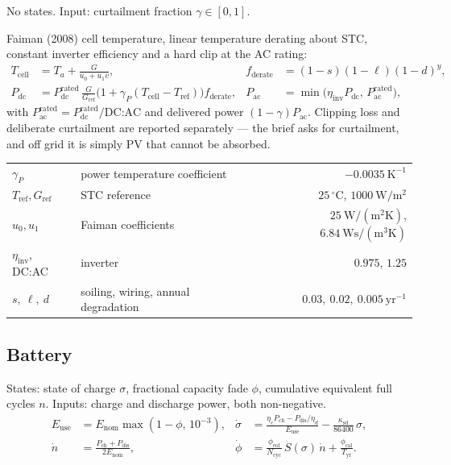 \documentclass[11pt,a4paper]{article}
\begin{document}
No states. Input: curtailment fraction $\gamma\in[0,1]$.

Faiman (2008) cell temperature, linear temperature derating about STC, constant
inverter efficiency and a hard clip at the AC rating:
\begin{align}
T_{\text{cell}} &= T_a + \frac{G}{u_0 + u_1 v}, &
f_{\text{derate}} &= (1-s)(1-\ell)(1-d)^{y},\\
P_{\text{dc}} &= P_{\text{dc}}^{\text{rated}}\,\frac{G}{G_{\text{ref}}}
  \bigl(1+\gamma_P (T_{\text{cell}}-T_{\text{ref}})\bigr) f_{\text{derate}}, &
P_{\text{ac}} &= \min\!\bigl(\eta_{\text{inv}} P_{\text{dc}},\, P_{\text{ac}}^{\text{rated}}\bigr),
\end{align}
with $P_{\text{ac}}^{\text{rated}} = P_{\text{dc}}^{\text{rated}}/\text{DC:AC}$
and delivered power $(1-\gamma)P_{\text{ac}}$. Clipping loss and deliberate
curtailment are reported separately --- the brief asks for curtailment, and off
grid it is simply PV that cannot be absorbed.

\begin{center}\small
\begin{tabular}{llr}
\toprule
$\gamma_P$ & power temperature coefficient & $-0.0035\ \mathrm{K^{-1}}$\\
$T_{\text{ref}}, G_{\text{ref}}$ & STC reference & $25\,^\circ$C, $1000\ \mathrm{W/m^2}$\\
$u_0, u_1$ & Faiman coefficients & $25\ \mathrm{W/(m^2K)}$, $6.84\ \mathrm{Ws/(m^3K)}$\\
$\eta_{\text{inv}}$, DC:AC & inverter & $0.975$, $1.25$\\
$s,\ \ell,\ d$ & soiling, wiring, annual degradation & $0.03,\ 0.02,\ 0.005\ \mathrm{yr^{-1}}$\\
\bottomrule
\end{tabular}
\end{center}

\subsection{Battery}

States: state of charge $\sigma$, fractional capacity fade $\phi$, cumulative
equivalent full cycles $n$. Inputs: charge and discharge power, both
non-negative.
\begin{align}
E_{\text{use}} &= E_{\text{nom}}\max(1-\phi,\,10^{-3}), &
\dot\sigma &= \frac{\eta_c P_{\text{ch}} - P_{\text{dis}}/\eta_d}{E_{\text{use}}}
   - \frac{\kappa_{\text{sd}}}{86400}\,\sigma,\\
\dot n &= \frac{P_{\text{ch}}+P_{\text{dis}}}{2E_{\text{nom}}}, &
\dot\phi &= \frac{\phi_{\text{eol}}}{N_{\text{cyc}}}\,S(\sigma)\,\dot n
   + \frac{\phi_{\text{cal}}}{T_{\text{yr}}} .
\end{align}
\end{document}

